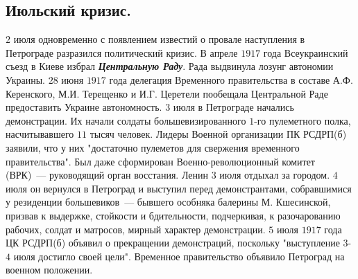 \documentclass[12pt]{article}
\begin{document}
	\subsection{Июльский кризис.}
	$2$ июля одновременно с появлением известий о провале наступления в Петрограде разразился политический кризис. В апреле $1917$ года Всеукраинский съезд в Киеве избрал \textbf{\textit{Центральную Раду}}. Рада выдвинула лозунг автономии Украины. $28$ июня $1917$ года делегация Временного правительства в составе А.Ф. Керенского, М.И. Терещенко и И.Г. Церетели пообещала Центральной Раде предоставить Украине автономность.
	$3$ июля в Петрограде начались демонстрации. Их начали солдаты большевизированного $1$-го пулеметного полка, насчитывавшего $11$ тысяч человек.
	Лидеры Военной организации ПК РСДРП(б) заявили, что у них "достаточно пулеметов для свержения временного правительства". Был даже сформирован Военно-революционный комитет (ВРК)~--- руководящий орган восстания.
	Ленин $3$ июля отдыхал за городом. $4$ июля он вернулся в Петроград и выступил перед демонстрантами, собравшимися у резиденции большевиков~--- бывшего особняка балерины М. Кшесинской, призвав к выдержке, стойкости и бдительности, подчеркивая, к разочарованию рабочих, солдат и матросов, мирный характер демонстрации.
	$5$ июля $1917$ года ЦК РСДРП(б) объявил о прекращении демонстраций, поскольку "выступление $3$-$4$ июля достигло своей цели". Временное правительство объявило Петроград на военном положении.
\end{document}
